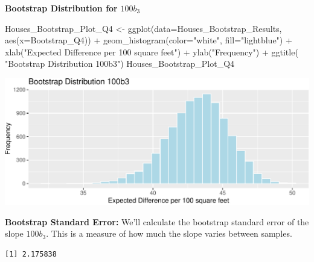 \documentclass[
  letterpaper,
  DIV=11,
  numbers=noendperiod]{scrreprt}
\newenvironment{Shaded}{\begin{snugshade}}{\end{snugshade}}
\newcommand{\AttributeTok}[1]{\textcolor[rgb]{0.40,0.45,0.13}{#1}}
\newcommand{\FunctionTok}[1]{\textcolor[rgb]{0.28,0.35,0.67}{#1}}
\newcommand{\NormalTok}[1]{\textcolor[rgb]{0.00,0.23,0.31}{#1}}
\newcommand{\OtherTok}[1]{\textcolor[rgb]{0.00,0.23,0.31}{#1}}
\newcommand{\SpecialCharTok}[1]{\textcolor[rgb]{0.37,0.37,0.37}{#1}}
\newcommand{\StringTok}[1]{\textcolor[rgb]{0.13,0.47,0.30}{#1}}
\begin{document}
\textbf{Bootstrap Distribution for} \(100b_3\)

\begin{Shaded}
\begin{Highlighting}[]
\NormalTok{Houses\_Bootstrap\_Plot\_Q4 }\OtherTok{\textless{}{-}} \FunctionTok{ggplot}\NormalTok{(}\AttributeTok{data=}\NormalTok{Houses\_Bootstrap\_Results, }
                                   \FunctionTok{aes}\NormalTok{(}\AttributeTok{x=}\NormalTok{Bootstrap\_Q4)) }\SpecialCharTok{+}  
  \FunctionTok{geom\_histogram}\NormalTok{(}\AttributeTok{color=}\StringTok{"white"}\NormalTok{, }\AttributeTok{fill=}\StringTok{"lightblue"}\NormalTok{) }\SpecialCharTok{+} 
  \FunctionTok{xlab}\NormalTok{(}\StringTok{"Expected Difference per 100 square feet"}\NormalTok{) }\SpecialCharTok{+} \FunctionTok{ylab}\NormalTok{(}\StringTok{"Frequency"}\NormalTok{) }\SpecialCharTok{+}
  \FunctionTok{ggtitle}\NormalTok{( }\StringTok{"Bootstrap Distribution 100b3"}\NormalTok{) }
\NormalTok{Houses\_Bootstrap\_Plot\_Q4}
\end{Highlighting}
\end{Shaded}

\includegraphics{Ch3_files/figure-pdf/unnamed-chunk-172-1.pdf}

\textbf{Bootstrap Standard Error:} We'll calculate the bootstrap
standard error of the slope \(100b_3\). This is a measure of how much
the slope varies between samples.

\begin{Shaded}
\end{Shaded}

\begin{verbatim}
[1] 2.175838
\end{verbatim}
\end{document}
